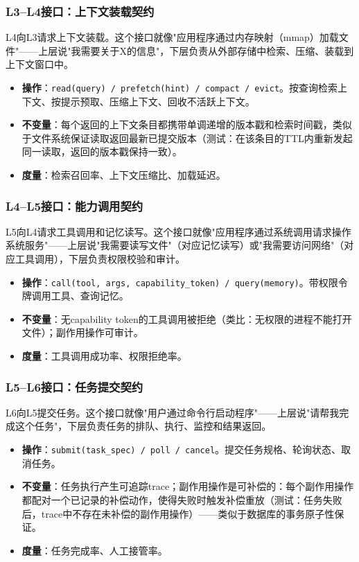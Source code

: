 \subsubsection{L3--L4接口：上下文装载契约}

L4向L3请求上下文装载。这个接口就像"应用程序通过内存映射（mmap）加载文件"——上层说"我需要关于X的信息"，下层负责从外部存储中检索、压缩、装载到上下文窗口中。

\begin{itemize}[nosep]
\item \textbf{操作}：\texttt{read(query) / prefetch(hint) / compact / evict}。按查询检索上下文、按提示预取、压缩上下文、回收不活跃上下文。
\item \textbf{不变量}：每个返回的上下文条目都携带单调递增的版本戳和检索时间戳，类似于文件系统保证读取返回最新已提交版本（测试：在该条目的TTL内重新发起同一读取，返回的版本戳保持一致）。
\item \textbf{度量}：检索召回率、上下文压缩比、加载延迟。
\end{itemize}

\subsubsection{L4--L5接口：能力调用契约}

L5向L4请求工具调用和记忆读写。这个接口就像"应用程序通过系统调用请求操作系统服务"——上层说"我需要读写文件"（对应记忆读写）或"我需要访问网络"（对应工具调用），下层负责权限校验和审计。

\begin{itemize}[nosep]
\item \textbf{操作}：\texttt{call(tool, args, capability\_token) / query(memory)}。带权限令牌调用工具、查询记忆。
\item \textbf{不变量}：无capability token的工具调用被拒绝（类比：无权限的进程不能打开文件）；副作用操作可审计\cite{debenedetti2025camel}。
\item \textbf{度量}：工具调用成功率、权限拒绝率。
\end{itemize}

\subsubsection{L5--L6接口：任务提交契约}

L6向L5提交任务。这个接口就像"用户通过命令行启动程序"——上层说"请帮我完成这个任务"，下层负责任务的排队、执行、监控和结果返回。

\begin{itemize}[nosep]
\item \textbf{操作}：\texttt{submit(task\_spec) / poll / cancel}。提交任务规格、轮询状态、取消任务。
\item \textbf{不变量}：任务执行产生可追踪trace；副作用操作是可补偿的：每个副作用操作都配对一个已记录的补偿动作，使得失败时触发补偿重放（测试：任务失败后，trace中不存在未补偿的副作用操作）——类似于数据库的事务原子性保证。
\item \textbf{度量}：任务完成率、人工接管率。
\end{itemize}

